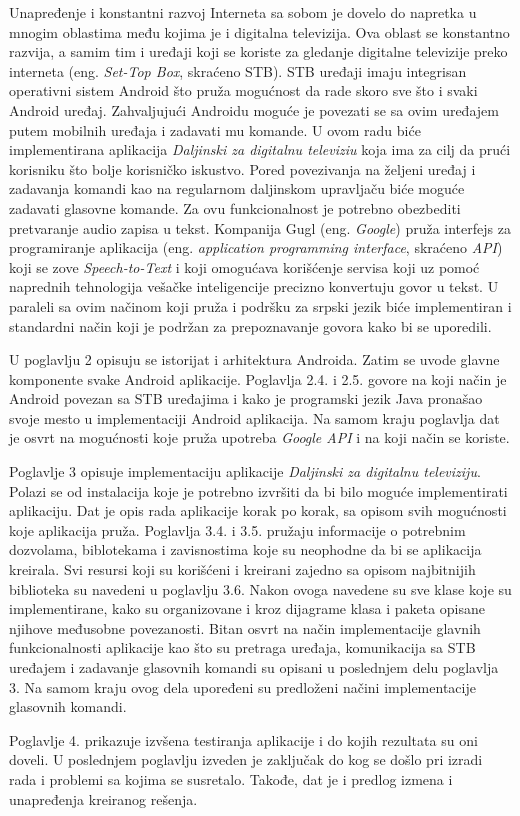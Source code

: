 \documentclass[TamaraIvanovicMasterRad.tex]{subfiles}
\begin{document}
Unapređenje i konstantni razvoj Interneta sa sobom je dovelo do napretka u mnogim oblastima među kojima je i digitalna televizija. Ova oblast se konstantno razvija, a samim tim i uređaji koji se koriste za gledanje digitalne televizije preko interneta (eng. \textit{Set-Top Box}, skraćeno STB). STB uređaji imaju integrisan operativni sistem Android što pruža mogućnost da rade skoro sve što i svaki Android uređaj. Zahvaljujući Androidu moguće je povezati se sa ovim uređajem putem mobilnih uređaja i zadavati mu komande. U ovom radu biće implementirana aplikacija \textit{Daljinski za digitalnu televiziu} koja ima za cilj da prući korisniku što bolje korisničko iskustvo. Pored povezivanja na željeni uređaj i zadavanja komandi kao na regularnom daljinskom upravljaču biće moguće zadavati glasovne komande. Za ovu funkcionalnost je potrebno obezbediti pretvaranje audio zapisa u tekst. Kompanija Gugl (eng. \textit{Google}) pruža interfejs za programiranje aplikacija (eng. \textit{application programming interface}, skraćeno \textit{API}) koji se zove \textit{Speech-to-Text} i koji omogućava korišćenje servisa koji uz pomoć naprednih tehnologija vešačke inteligencije precizno konvertuju govor u tekst. U paraleli sa ovim načinom koji pruža i podršku za srpski jezik biće implementiran i standardni način koji je podržan za prepoznavanje govora kako bi se uporedili.

U poglavlju 2 opisuju se istorijat i arhitektura Androida. Zatim se uvode glavne komponente svake Android aplikacije. Poglavlja 2.4. i 2.5. govore na koji način je Android povezan sa STB uređajima i kako je programski jezik Java pronašao svoje mesto u implementaciji Android aplikacija. Na samom kraju poglavlja dat je osvrt na mogućnosti koje pruža upotreba \textit{Google API} i na koji način se koriste.

Poglavlje 3 opisuje implementaciju aplikacije \textit{Daljinski za digitalnu televiziju}. Polazi se od instalacija koje je potrebno izvršiti da bi bilo moguće implementirati aplikaciju. Dat je opis rada aplikacije korak po korak, sa opisom svih mogućnosti koje aplikacija pruža. Poglavlja 3.4. i 3.5. pružaju informacije o potrebnim dozvolama, biblotekama i zavisnostima koje su neophodne da bi se aplikacija kreirala. Svi resursi koji su korišćeni i kreirani zajedno sa opisom najbitnijih biblioteka su navedeni u poglavlju 3.6. Nakon ovoga navedene su sve klase koje su implementirane, kako su organizovane i kroz dijagrame klasa i paketa opisane njihove međusobne povezanosti. Bitan osvrt na način implementacije glavnih funkcionalnosti aplikacije kao što su pretraga uređaja, komunikacija sa STB uređajem i zadavanje glasovnih komandi su opisani u poslednjem delu poglavlja 3. Na samom kraju ovog dela upoređeni su predloženi načini implementacije glasovnih komandi. 

Poglavlje 4. prikazuje izvšena testiranja aplikacije i do kojih rezultata su oni doveli.
U poslednjem poglavlju izveden je zaključak do kog se došlo pri izradi rada i problemi sa kojima se susretalo. Takođe, dat je i predlog izmena i unapređenja kreiranog rešenja.
\end{document}
